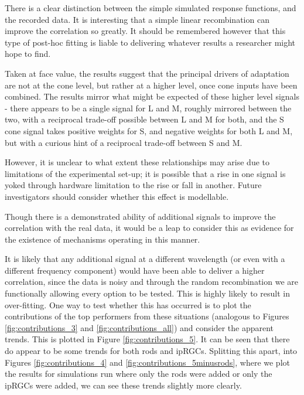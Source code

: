 There is a clear distinction between the simple simulated response functions, and the recorded data. It is interesting that a simple linear recombination can improve the correlation so greatly. It should be remembered however that this type of post-hoc fitting is liable to delivering whatever results a researcher might hope to find. 

Taken at face value, the results suggest that the principal drivers of adaptation are not at the cone level, but rather at a higher level, once cone inputs have been combined. The results mirror what might be expected of these higher level signals - there appears to be a single signal for L and M, roughly mirrored between the two, with a reciprocal trade-off possible between L and M for both, and the S cone signal takes positive weights for S, and negative weights for both L and M, but with a curious hint of a reciprocal trade-off between S and M.

However, it is unclear to what extent these relationships may arise due to limitations of the experimental set-up; it is possible that a rise in one signal is yoked through hardware limitation to the rise or fall in another. Future investigators should consider whether this effect is modellable.

Though there is a demonstrated ability of additional signals to improve the correlation with the real data, it would be a leap to consider this as evidence for the existence of mechanisms operating in this manner.

It is likely that any additional signal at a different wavelength (or even with a different frequency component) would have been able to deliver a higher correlation, since the data is noisy and through the random recombination we are functionally allowing every option to be tested. This is highly likely to result in over-fitting. One way to test whether this has occurred is to plot the contributions of the top performers from these situations (analogous to Figures \ref{fig:contributions_3} and \ref{fig:contributions_all}) and consider the apparent trends. This is plotted in Figure \ref{fig:contributions_5}. It can be seen that there do appear to be some trends for both rods and \glspl{ipRGC}. Splitting this apart, into Figures \ref{fig:contributions_4} and \ref{fig:contributions_5minusrods}, where we plot the results for simulations run where only the rods were added or only the \glspl{ipRGC} were added, we can see these trends slightly more clearly.

